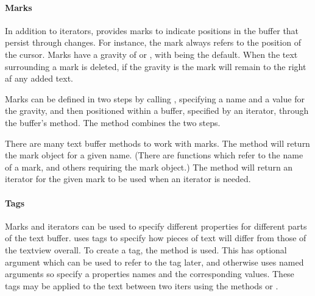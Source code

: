 \paragraph{Marks}
In addition to iterators, \GTK\/ provides marks to indicate positions
in the buffer that persist through changes. For instance, the mark
 always refers to the position of the cursor. Marks have a
gravity of  or , with  being the
default. When the text surrounding a mark is deleted, if the gravity
is  the mark will remain to the right af any added
text. 


Marks can be defined in two steps by calling ,
specifying a name and a value for the gravity, and then 
positioned within a buffer, specified by an iterator, through the
buffer's  method. The
 method combines the two steps.

There are many text buffer methods to work with marks. The
 method will return the mark object for
a given name. (There are functions which refer to the name of a mark,
and others requiring the mark object.) The method  will return
an iterator for the given mark to be used when an iterator is needed.


\paragraph{Tags}
Marks and iterators can be used to specify different properties for
different parts of the text buffer. \GTK\/ uses tags to specify how
pieces of text will differ from those of the textview overall. To
create a tag, the  method is
used. This has optional argument
 which can be used to refer to
the tag later, and otherwise uses named arguments so specify a properties
names and the corresponding values. These tags may be applied to the text between
two iters using the methods  or
.

